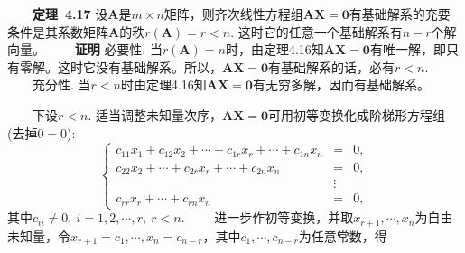 \documentclass[compress,mathserif,cjk]{beamer}
\theoremstyle{remark}
\numberwithin{equation}{section}
\newcommand{\hei}{\bf}      %
\begin{document}
\begin{CJK}{UTF8}{gbsn}
\begin{frame}
\ \ \ \ {\hei 定理~4.17} 设$\bm A$是$m\times n$矩阵，则齐次线性方程组$\bm{AX}=\bm0$有基础解系的充要条件是其系数矩阵$\bm A$的秩$r(\bm A)=r<n$. 这时它的任意一个基础解系有$n-r$个解向量。
\pause\vskip 10pt
 \ \ \ \ {\hei 证明} 必要性. 当$r(\bm A)=n$时，由定理4.16知$\bm{AX}=\bm0$有唯一解，即只有零解。这时它没有基础解系。所以，$\bm{AX}=\bm0$有基础解系的话，必有$r<n$.
 \pause\vskip 5pt
 \ \ \ \ 充分性. 当$r<n$时由定理4.16知$\bm{AX}=\bm0$有无穷多解，因而有基础解系。
 \end{frame}

\begin{frame}
 \ \ \ \ 下设$r<n$. 适当调整未知量次序，$\bm{AX}=\bm0$可用初等变换化成阶梯形方程组(去掉$0=0$):
 \begin{equation}\label{e419}
 \left\{\begin{array}{rcl}
 c_{11}x_1+c_{12}x_2+\cdots+c_{1r}x_r+\cdots+c_{1n}x_n&=&0,\\
 c_{22}x_2+\cdots+c_{2r}x_r+\cdots+c_{2n}x_n&=&0,\\
 &\vdots&\\
 c_{rr}x_r+\cdots+c_{rn}x_n&=&0,
 \end{array}\right.
 \end{equation}
 其中$c_{ii}\neq0,~i=1,2,\cdots,r,~r<n$.
 \vskip 5pt
 \ \ \ \  进一步作初等变换，并取$x_{r+1},\cdots,x_n$为自由未知量，令$x_{r+1}=c_1,\cdots,x_n=c_{n-r}$，其中$c_1,\cdots,c_{n-r}$为任意常数，得
\end{frame}


\end{CJK}
\end{document}
